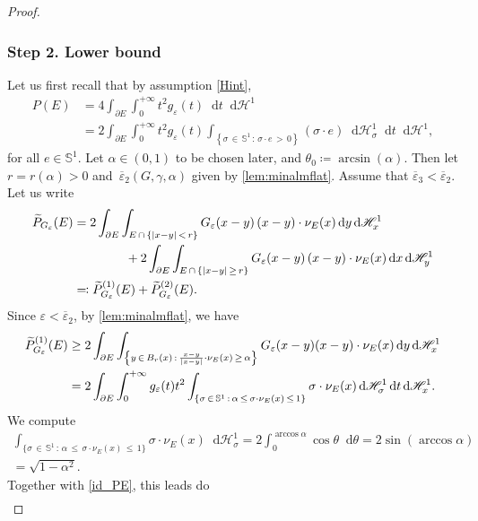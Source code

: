 \documentclass[JEP,XML,SOM,Unicode,published]{cedram}
\newcommand{\sep}{\,:\,}
\numberwithin{equation}{section}
\theoremstyle{plain}
\theoremstyle{definition}
\newcommand{\dd}{\mathop{}\mathopen{}\mathrm{d}}
\newcommand{\dx}{\mathop{}\mathopen{}\mathrm{d}x}
\newcommand{\dy}{\mathop{}\mathopen{}\mathrm{d}y}
\newcommand{\dt}{\mathop{}\mathopen{}\mathrm{d}t}
\newcommand{\dH}{\mathop{}\mathopen{}\mathrm{d}\mathscr{H}}
\newcommand{\bbS}{\mathbb{S}}
\let\eps\varepsilon
\let\ol\overline
\let\wt\widetilde
\DeclarePairedDelimiter{\abs}{\lvert}{\rvert}
\begin{document}
\begin{proof}
\subsubsection*{Step 2. Lower bound}
Let us first recall that by assumption \cref{Hint},
\begin{equation}\label{id_PE}
\begin{aligned}
P(E)
&=4\int_{\partial E}\int_0^{+\infty} t^2g_\eps(t)\dt\dH^1\\
&=2\int_{\partial E} \int_0^{+\infty} t^2g_\eps(t)\int_{\left\{\sigma\,\in\,\bbS^1\sep \sigma\cdot
e\,>\,0\right\}} (\sigma\cdot e) \dH^1_\sigma\dt\dH^1,
\end{aligned}
\end{equation}
for all $ e\in\bbS^1$.
Let $\alpha\in(0,1)$ to be chosen later, and $\theta_0\coloneqq \arcsin(\alpha)$.
Then let $r=r(\alpha)>0$ and~$\ol{\eps}_2(G,\gamma,\alpha)$ given by \cref{lem:minalmflat}. Assume
that $\ol{\eps}_3<\ol{\eps}_2$.
Let us write
\[
\begin{aligned}
\wt{P}_{G_\eps}(E)
&=2\int_{\partial E} \int_{E\,\cap\,\{\abs{x-y}\,<\,r\}} G_\eps(x-y)\,(x-y)\cdot\nu_E(x)\dy\dH^1_x\\
&\hphantom{=\int_{\partial E} \int_E}
+2\int_{\partial E} \int_{E\,\cap\,\{\abs{x-y}\,\geq\, r\}}
G_\eps(x-y)\,(x-y)\cdot\nu_E(x)\dx\dH^1_y\\
&\eqqcolon \wt{P}_{G_\eps}^{(1)}(E)+\wt{P}_{G_\eps}^{(2)}(E).
\end{aligned}
\]
Since $\eps<\ol{\eps}_2$, by \cref{lem:minalmflat}, we have
\[
\begin{aligned}
\wt{P}_{G_\eps}^{(1)}(E)
&\geq 2\int_{\partial E} \int_{\left\{y\,\in\, B_r(x)\sep 
\frac{x-y}{\abs{x-y}}\cdot\nu_E(x)\,\geq\,\alpha\right\}}
G_\eps(x-y)(x-y)\cdot\nu_E(x)\dy\dH_x^1\\
&=2\int_{\partial E} \int_0^{+\infty} g_\eps(t)t^2
\int_{\left\{\sigma\,\in\,\bbS^1\sep \alpha\,\leq\,\sigma\cdot
\nu_E(x)\,\leq\, 1\right\}} \sigma\cdot\nu_E(x)\dH^1_\sigma\dt\dH^1_x.
\end{aligned}
\]
We compute\vspace*{-3pt}
\begin{multline*}
\int_{\{\sigma\,\in\,\bbS^1\sep \alpha\,\leq\,\sigma\cdot\nu_E(x)\,\leq\, 1\}}
\sigma\cdot\nu_E(x)\dH^1_\sigma
=2\int_0^{\arccos\alpha} \cos\theta\dd\theta
=2\sin(\arccos\alpha)\\[-5pt]
=\sqrt{1-\alpha^2}.
\end{multline*}
Together with \cref{id_PE}, this leads do
\[
\begin{aligned}

\end{aligned}\]
\end{proof}
\end{document}
